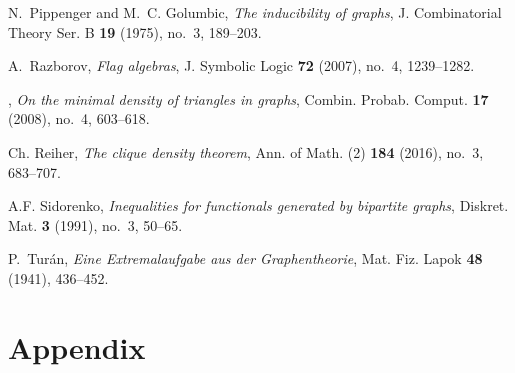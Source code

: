 \documentclass[12pt]{article}
\def\MR#1{}
\theoremstyle{definition}
\theoremstyle{remark}
\def\outercycle#1#2{ \draw \foreach \x in {0,1,...,#1}{(270-45+\x*360/#2:0.5) coordinate(x\x)};}
\begin{document}
\begin{thebibliography}{10}
N.~Pippenger and M.~C. Golumbic, \emph{The inducibility of graphs}, J.
  Combinatorial Theory Ser. B \textbf{19} (1975), no.~3, 189--203. \MR{0401552}

A.~Razborov, \emph{Flag algebras}, J. Symbolic Logic \textbf{72} (2007), no.~4,
  1239--1282. \MR{2371204}

\bysame, \emph{On the minimal density of triangles in graphs}, Combin. Probab.
  Comput. \textbf{17} (2008), no.~4, 603--618. \MR{2433944}

Ch. Reiher, \emph{The clique density theorem}, Ann. of Math. (2) \textbf{184}
  (2016), no.~3, 683--707. \MR{3549620}

A.F. Sidorenko, \emph{Inequalities for functionals generated by bipartite
  graphs}, Diskret. Mat. \textbf{3} (1991), no.~3, 50--65.

P.~Tur\'an, \emph{Eine {E}xtremalaufgabe aus der {G}raphentheorie}, Mat. Fiz.
  Lapok \textbf{48} (1941), 436--452. \MR{0018405}

\end{thebibliography}



\appendix

\newpage 

\section{Appendix}\label{appendix:A}



\end{document}
